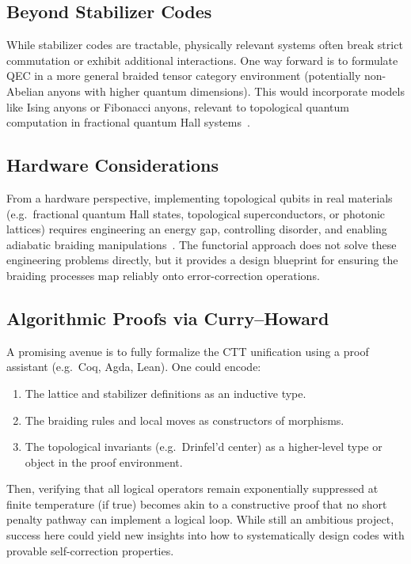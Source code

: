 \documentclass[12pt]{article}
\begin{document}
\subsection{Beyond Stabilizer Codes}
While stabilizer codes are tractable, physically relevant systems often break strict commutation or exhibit additional interactions. One way forward is to formulate QEC in a more general braided tensor category environment (potentially non-Abelian anyons with higher quantum dimensions). This would incorporate models like Ising anyons or Fibonacci anyons, relevant to topological quantum computation in fractional quantum Hall systems~\cite{sarma2005topological}.

\subsection{Hardware Considerations}
From a hardware perspective, implementing topological qubits in real materials (e.g.\ fractional quantum Hall states, topological superconductors, or photonic lattices) requires engineering an energy gap, controlling disorder, and enabling adiabatic braiding manipulations~\cite{kouwenhoven2012fractional, nayak2008non}. The functorial approach does not solve these engineering problems directly, but it provides a design blueprint for ensuring the braiding processes map reliably onto error-correction operations.

\subsection{Algorithmic Proofs via Curry–Howard}
A promising avenue is to fully formalize the CTT unification using a proof assistant (e.g.\ Coq, Agda, Lean). One could encode:
\begin{enumerate}
    \item The lattice and stabilizer definitions as an inductive type.
    \item The braiding rules and local moves as constructors of morphisms.
    \item The topological invariants (e.g.\ Drinfel’d center) as a higher-level type or object in the proof environment.
\end{enumerate}
Then, verifying that all logical operators remain exponentially suppressed at finite temperature (if true) becomes akin to a constructive proof that no short penalty pathway can implement a logical loop. While still an ambitious project, success here could yield new insights into how to systematically design codes with provable self-correction properties.
\end{document}
